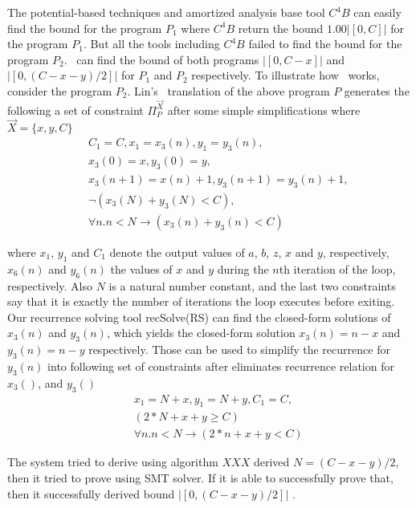The potential-based techniques and amortized analysis base tool $C^{4}B$ can easily find the bound for the program $P_1$ where $C^{4}B$ return the bound $1.00 |[0, C]|$ for the program $P_1$. But all the tools including $C^{4}B$ failed to find the bound for the program $P_2$. \SystemName\ can find the bound of both programs $ |[0, C-x]|$ and $ |[0, (C-x-y)/2]|$ for $P_1$ and $P_2$ respectively. To illustrate how \SystemName\ works, consider the program $P_2$. Lin's~\cite{Lin20161} translation of the above program $P$ generates the following a set of constraint $\Pi^{\vec{X}}_{P}$ after some simple simplifications where $\vec{X}=\{x,y,C\}$
\begin{eqnarray*}
	&& C_1=C , x_1 = x_3(n), y_1 = y_3(n), \\
	&& x_3(0) = x, y_3(0) = y, \\
	&& x_3(n+1) = x(n)+1, y_3(n+1) = y_3(n)+1, \\
	&&\neg (x_3(N)+y_3(N)<C), \\
	&& \forall n. n<N\rightarrow (x_3(n)+y_3(n)<C)
\end{eqnarray*}

where  $x_1$, $y_1$ and $C_1$ denote the output values of $a$, $b$, $z$, $x$ and $y$, respectively,
$x_6(n)$ and $y_6(n)$ the values of $x$ and $y$ during the $n$th iteration
of the loop, respectively. Also
$N$ is a natural number constant, and the last two constraints say that it
is exactly the number of iterations the loop executes before exiting. Our recurrence solving tool recSolve(RS) can find the closed-form solutions of $x_3(n)$ and $y_3(n)$, which yields the closed-form solution $x_3(n)=n-x$ and $y_3(n)=n-y$ respectively. Those can be used to simplify the recurrence for $y_3(n)$ into following set of constraints after eliminates recurrence relation for $x_3()$, and $y_3()$
\begin{eqnarray*}
	&& x_1 = N+x, y_1 = N+y, C_1=C,\\
	&& (2*N+x+y \geq C) \\
	&& \forall n. n<N\rightarrow (2*n+x+y<C)
\end{eqnarray*}

The system tried to derive using algorithm $XXX$ derived $N=(C-x-y)/2$, then it tried to prove using SMT solver. 
If it is able to successfully prove that, then it successfully derived bound $ |[0, (C-x-y)/2]|$ .




